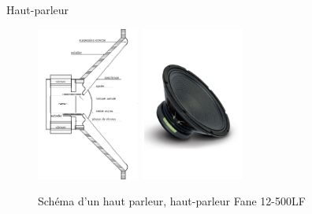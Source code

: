 \documentclass[aspectratio=169]{beamer}
\begin{document}
\begin{frame}{Haut-parleur}
\begin{figure}[!h]
	\begin{center}
	\includegraphics[width=0.3\textwidth]{figure/HP_schema_2}
	\hspace{2cm}
	\includegraphics[width=0.3\textwidth]{figure/fane12-500lf.jpg}
	\end{center}
	\caption{Schéma d'un haut parleur, haut-parleur Fane 12-500LF}
	\label{HP_model}
\end{figure}
\end{frame}
\end{document}

